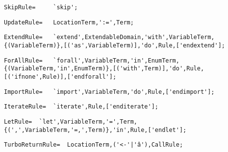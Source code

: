 \documentclass{article}
\begin{document}
    \begin{flushleft}
    \begin{lstlisting}[mathescape=true, breaklines=true]
      SkipRule= 	`skip';
    \end{lstlisting}
    \end{flushleft}
    \begin{flushleft}
    \begin{lstlisting}[mathescape=true, breaklines=true]
      UpdateRule= 	LocationTerm,':=',Term;
    \end{lstlisting}
    \end{flushleft}
    \begin{flushleft}
    \begin{lstlisting}[mathescape=true, breaklines=true]
      ExtendRule= 	`extend',ExtendableDomain,'with',VariableTerm,{(VariableTerm)},[('as',VariableTerm)],'do',Rule,['endextend'];
    \end{lstlisting}
    \end{flushleft}
    \begin{flushleft}
    \begin{lstlisting}[mathescape=true, breaklines=true]
      ForAllRule= 	`forall',VariableTerm,'in',EnumTerm,{(VariableTerm,'in',EnumTerm)},[('with',Term)],'do',Rule,[('ifnone',Rule)],['endforall'];
    \end{lstlisting}
    \end{flushleft}
    \begin{flushleft}
    \begin{lstlisting}[mathescape=true, breaklines=true]
      ImportRule= 	`import',VariableTerm,'do',Rule,['endimport'];
    \end{lstlisting}
    \end{flushleft}
    \begin{flushleft}
    \begin{lstlisting}[mathescape=true, breaklines=true]
      IterateRule= 	`iterate',Rule,['enditerate'];
    \end{lstlisting}
    \end{flushleft}
    \begin{flushleft}
    \begin{lstlisting}[mathescape=true, breaklines=true]
      LetRule= 	`let',VariableTerm,'=',Term,{(',',VariableTerm,'=,',Term)},'in',Rule,['endlet'];
    \end{lstlisting}
    \end{flushleft}
    \begin{flushleft}
    \begin{lstlisting}[mathescape=true, breaklines=true]
      TurboReturnRule= 	LocationTerm,('<-'|'â'),CallRule;
    \end{lstlisting}
    \end{flushleft}
\end{document}
